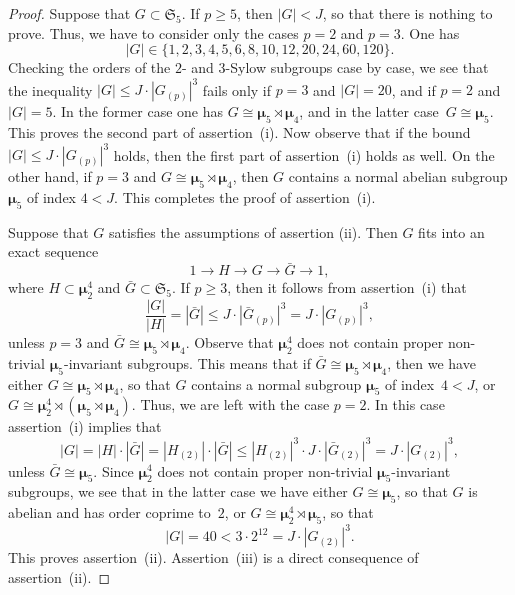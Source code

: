 \documentclass[12pt]{amsart}
\numberwithin{equation}{section}
\theoremstyle{definition}
\newcommand{\mumu}{\boldsymbol{\mu}}
\def \ge {\geqslant}
\def \le {\leqslant}
\begin{document}
\begin{proof}
Suppose that $G\subset \mathfrak{S}_5$. If $p\ge 5$, then $|G|<J$, so that
there is nothing to prove. Thus, we have to consider only the cases $p=2$ and $p=3$.
One has
$$
|G|\in\{1,2,3,4,5,6,8,10,12,20,24,60,120\}.
$$
Checking the orders of the $2$- and $3$-Sylow subgroups case by case, we see that the
inequality $|G|\le J\cdot |G_{(p)}|^3$ fails only if $p=3$ and $|G|=20$, and if
$p=2$ and~\mbox{$|G|=5$}. In the former case one has $G\cong\mumu_5\rtimes\mumu_4$,
and in the latter case~\mbox{$G\cong\mumu_5$}. This proves the second part of assertion~(i).
Now observe that if the bound~\mbox{$|G|\le J\cdot |G_{(p)}|^3$} holds, then the first part of assertion~(i)
holds as well. On the other hand, if $p=3$ and $G\cong\mumu_5\rtimes\mumu_4$, then
$G$ contains a normal abelian subgroup $\mumu_5$ of index $4<J$.
This completes the proof of assertion~(i).

Suppose that $G$ satisfies the assumptions of assertion (ii). Then $G$ fits into
an exact sequence
$$
1\to H\to G\to\bar{G}\to 1,
$$
where $H\subset \mumu_2^4$ and $\bar{G}\subset\mathfrak{S}_5$.
If $p\ge 3$, then it follows from assertion~(i) that
$$
\frac{|G|}{|H|}=|\bar{G}|\le J\cdot |\bar{G}_{(p)}|^3= J\cdot |G_{(p)}|^3,
$$
unless $p=3$ and $\bar{G}\cong\mumu_5\rtimes \mumu_4$. Observe that
$\mumu_2^4$ does not contain proper non-trivial $\mumu_5$-invariant subgroups.
This means that if $\bar{G}\cong\mumu_5\rtimes \mumu_4$, then we have either $G\cong\mumu_5\rtimes\mumu_4$, so that $G$ contains a normal subgroup $\mumu_5$
of index~\mbox{$4<J$}, or $G\cong\mumu_2^4\rtimes (\mumu_5\rtimes\mumu_4)$.
Thus, we are left with the case $p=2$.
In this case assertion~(i) implies that
$$
|G|=|H|\cdot |\bar{G}|=|H_{(2)}|\cdot |\bar{G}|\le |H_{(2)}|^3\cdot  J\cdot |\bar{G}_{(2)}|^3=
J\cdot |G_{(2)}|^3,
$$
unless $\bar{G}\cong \mumu_5$.
Since $\mumu_2^4$ does not contain proper non-trivial $\mumu_5$-invariant subgroups,
we see that in the latter case we have either $G\cong\mumu_5$, so that
$G$ is abelian and has order coprime to~$2$, or
$G\cong\mumu_2^4\rtimes \mumu_5$, so that
$$
|G|=40 < 3\cdot 2^{12}=J\cdot |G_{(2)}|^3.
$$
This proves assertion~(ii). Assertion~(iii) is a direct consequence of assertion~(ii).


\end{proof}
\end{document}
